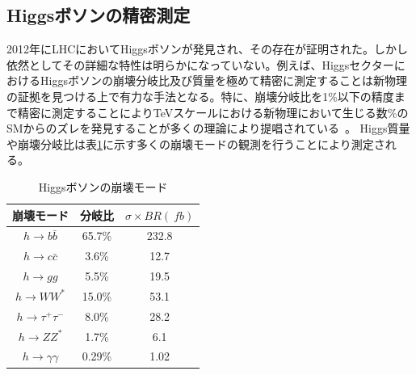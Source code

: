 \subsection{Higgsボソンの精密測定}
2012年にLHCにおいてHiggsボソンが発見され、その存在が証明された。しかし依然としてその詳細な特性は明らかになっていない。例えば、HiggsセクターにおけるHiggsボソンの崩壊分岐比及び質量を極めて精密に測定することは新物理の証拠を見つける上で有力な手法となる。特に、崩壊分岐比を1\%以下の精度まで精密に測定することによりTeVスケールにおける新物理において生じる数\%のSMからのズレを発見することが多くの理論により提唱されている~\cite{Snowmass}。
Higgs質量や崩壊分岐比は表\ref{HiggsDecay}に示す多くの崩壊モードの観測を行うことにより測定される。

\begin{table}[h]
	\begin{center}
		\begin{tabular}{|ccc|}
		\hline
		崩壊モード&分岐比&$\sigma\times BR(\SI{}{fb})$\\\hline\hline
		$h\rightarrow b\bar{b}$&65.7\%&232.8\\\hline
		$h\rightarrow c\bar{c}$&3.6\%&12.7\\\hline
		$h\rightarrow gg$&5.5\%&19.5\\\hline
		$h\rightarrow WW^*$&15.0\%&53.1\\\hline
		$h\rightarrow \tau^+\tau^-$&8.0\%&28.2\\\hline
		$h\rightarrow ZZ^*$&1.7\%&6.1\\\hline
		$h\rightarrow \gamma\gamma$&0.29\%&1.02\\\hline		
		\end{tabular}
	\end{center}
	\caption[Higgsボソンの崩壊モード]{Higgsボソンの崩壊モード}
\label{HiggsDecay}
\end{table}

